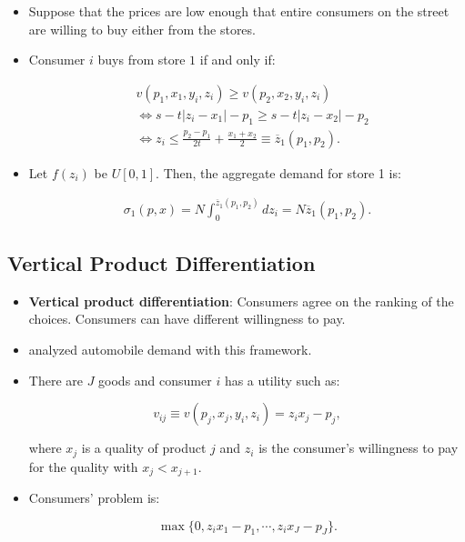 \documentclass[]{book}
\providecommand{\tightlist}{%
  \setlength{\itemsep}{0pt}\setlength{\parskip}{0pt}}
\begin{document}
\begin{itemize}
\tightlist
\item
  Suppose that the prices are low enough that entire consumers on the
  street are willing to buy either from the stores.
\item
  Consumer \(i\) buys from store \(1\) if and only if:

  \begin{equation}
  \begin{split}
  &v(p_1, x_1, y_i, z_i) \ge v(p_2, x_2, y_i, z_i)\\
  &\Leftrightarrow s - t |z_i - x_1| - p_1 \ge s - t |z_i - x_2|- p_2\\
  &\Leftrightarrow z_i \le \frac{p_2 - p_1}{2 t} + \frac{x_1 + x_2}{2} \equiv \overline{z}_1(p_1, p_2).
  \end{split}
  \end{equation}
\item
  Let \(f(z_i)\) be \(U[0, 1]\). Then, the aggregate demand for store 1
  is:

  \begin{equation}
  \begin{split}
  \sigma_1(p, x) = N \int_{0}^{\overline{z}_1(p_1, p_2)} d z_i = N\overline{z}_1(p_1, p_2).
  \end{split}
  \end{equation}
\end{itemize}

\subsection{Vertical Product
Differentiation}\label{vertical-product-differentiation}

\begin{itemize}
\tightlist
\item
  \textbf{Vertical product differentiation}: Consumers agree on the
  ranking of the choices. Consumers can have different willingness to
  pay.
\item
  \citet{Bresnahan1987} analyzed automobile demand with this framework.
\item
  There are \(J\) goods and consumer \(i\) has a utility such as:

  \begin{equation}
  v_{ij} \equiv v(p_j, x_j, y_i, z_i) = z_i x_j - p_j,
  \end{equation}

  where \(x_j\) is a quality of product \(j\) and \(z_i\) is the
  consumer's willingness to pay for the quality with
  \(x_j < x_{j + 1}\).
\item
  Consumers' problem is:

  \begin{equation}
  \max\{0, z_i x_1 - p_1, \cdots, z_i x_J - p_J \}.
  \end{equation}
\end{itemize}
\end{document}
